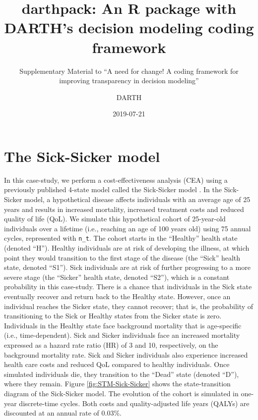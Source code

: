 \documentclass[]{book}
\title{darthpack: An R package with DARTH's decision modeling coding framework}
\subtitle{Supplementary Material to ``A need for change! A coding framework for
improving transparency in decision modeling''}
\author{DARTH}
\date{2019-07-21}
\begin{document}
\maketitle

{
\setcounter{tocdepth}{1}
\tableofcontents
}
\chapter*{The Sick-Sicker model}\label{the-sick-sicker-model}

In this case-study, we perform a cost-effectiveness analysis (CEA) using
a previously published 4-state model called the Sick-Sicker model
\citep{Enns2015}. In the Sick-Sicker model, a hypothetical disease
affects individuals with an average age of 25 years and results in
increased mortality, increased treatment costs and reduced quality of
life (QoL). We simulate this hypothetical cohort of 25-year-old
individuals over a lifetime (i.e., reaching an age of 100 years old)
using 75 annual cycles, represented with \texttt{n\_t}. The cohort
starts in the ``Healthy'' health state (denoted ``H''). Healthy
individuals are at risk of developing the illness, at which point they
would transition to the first stage of the disease (the ``Sick'' health
state, denoted ``S1''). Sick individuals are at risk of further
progressing to a more severe stage (the ``Sicker'' health state, denoted
``S2''), which is a constant probability in this case-study. There is a
chance that individuals in the Sick state eventually recover and return
back to the Healthy state. However, once an individual reaches the
Sicker state, they cannot recover; that is, the probability of
transitioning to the Sick or Healthy states from the Sicker state is
zero. Individuals in the Healthy state face background mortality that is
age-specific (i.e., time-dependent). Sick and Sicker individuals face an
increased mortality expressed as a hazard rate ratio (HR) of 3 and 10,
respectively, on the background mortality rate. Sick and Sicker
individuals also experience increased health care costs and reduced QoL
compared to healthy individuals. Once simulated individuals die, they
transition to the ``Dead'' state (denoted ``D''), where they remain.
Figure \ref{fig:STM-Sick-Sicker} shows the state-transition diagram of
the Sick-Sicker model. The evolution of the cohort is simulated in
one-year discrete-time cycles. Both costs and quality-adjusted life
years (QALYs) are discounted at an annual rate of 0.03\%.
\end{document}
